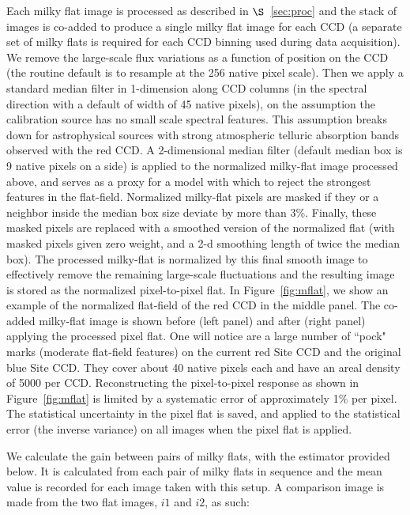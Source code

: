 \documentclass[12pt,preprint]{aastex}
\begin{document}
Each milky flat image is processed as described in $\S$~\ref{sec:proc}
and the stack of images is co-added to produce a single milky flat image 
for each CCD 
(a separate set of milky flats is required for each 
CCD binning used during data acquisition).
We remove the large-scale flux variations as a function of position on the
CCD (the routine default is to resample at the 256 native pixel scale).
Then we apply a standard median filter in 1-dimension along CCD columns
(in the spectral direction with a default of width of 45 native pixels),
on the assumption the calibration source has no small scale spectral features.
This assumption breaks down for astrophysical sources with 
strong atmospheric telluric absorption bands observed with the red CCD.
A 2-dimensional median filter (default median box is 9 native pixels on a side)
is applied to the normalized milky-flat image processed above,
and serves as a proxy for a model with which to reject the strongest features 
in the flat-field.  Normalized milky-flat pixels are masked if they or a 
neighbor inside the median box size deviate by more than 3\%.  Finally, these masked
pixels are replaced with a smoothed version of the normalized flat (with masked pixels given zero weight, and a 2-d smoothing length of twice the median box).  
The processed milky-flat is normalized by this final smooth image to 
effectively remove the remaining large-scale fluctuations and the resulting 
image is stored as the normalized pixel-to-pixel flat.  
In Figure~\ref{fig:mflat}, we 
show an example of the normalized flat-field of the red CCD in the middle panel.
The co-added milky-flat image is shown before (left panel) and after 
(right panel) applying the processed pixel flat.  
One will notice are a large number of ``pock" marks 
(moderate flat-field features) on the current red Site CCD and 
the original blue Site CCD.  They cover about 40 native pixels each and have an 
areal density of 5000 per CCD.    
Reconstructing the pixel-to-pixel response as shown in Figure~\ref{fig:mflat} 
is limited by a systematic error of approximately 1\% per pixel.
The statistical uncertainty in the pixel flat is saved, and applied to
the statistical error (the inverse variance) on all images when 
the pixel flat is applied.

We calculate the gain between pairs of milky flats, with the estimator
provided below.  It is calculated from each pair of milky flats in 
sequence and the mean value is recorded for each image taken with this setup.
A comparison image is made from the two flat images, $i1$ and $i2$, as such:
\end{document}
